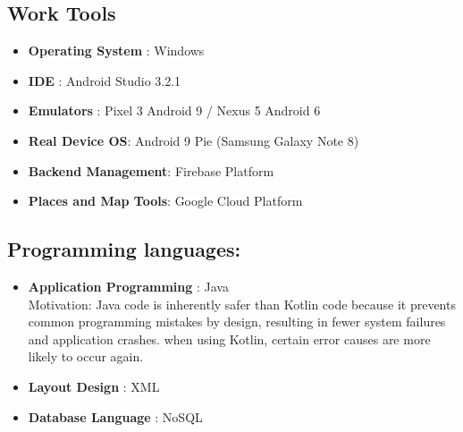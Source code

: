 \subsection{Work Tools}
\begin{itemize}
\item \textbf{Operating System }: Windows 
\item \textbf{IDE }: Android Studio 3.2.1
\item \textbf{Emulators }: Pixel 3 Android 9 / Nexus 5 Android 6
\item \textbf{Real Device OS}: Android 9 Pie (Samsung Galaxy Note 8)
\item \textbf{Backend Management}: Firebase Platform
\item \textbf{Places and Map Tools}: Google Cloud Platform
\end{itemize}
 

\subsection{Programming languages:} 
\begin{itemize}
\item \textbf{Application Programming }: Java\\
Motivation: Java code is inherently safer than Kotlin code because it 
prevents common programming mistakes by design, resulting in fewer 
system failures and application crashes. when using Kotlin, certain error 
causes are more likely to occur again.
\item \textbf{Layout Design }: XML
\item \textbf{Database Language }: NoSQL
\end{itemize}

